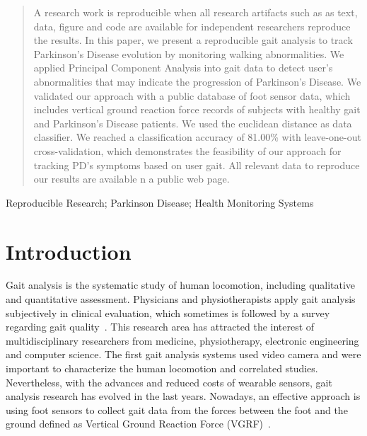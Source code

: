 \documentclass[10pt, conference, compsocconf]{IEEEtran}
\begin{document}




\maketitle


\begin{abstract}
A research work is reproducible when all research artifacts such as as text, data, figure and code are available for independent researchers reproduce the results. In this paper, we present a reproducible gait analysis to track Parkinson's Disease evolution by monitoring walking abnormalities. We applied Principal Component Analysis into gait data to detect user's abnormalities that may indicate the progression of Parkinson's Disease. We validated our approach with a public database of foot sensor data, which includes vertical ground reaction force records of subjects with healthy gait and Parkinson's Disease patients. We used the euclidean distance as data classifier. We reached a classification accuracy of 81.00\% with leave-one-out cross-validation, which demonstrates the feasibility of our approach for tracking PD's symptoms based on user gait. All relevant data to reproduce our results are available n a public web page.
\end{abstract}

\begin{IEEEkeywords}
Reproducible Research; Parkinson Disease; Health Monitoring Systems
\end{IEEEkeywords}


%
\IEEEpeerreviewmaketitle



\section{Introduction}
Gait analysis is the systematic study of human locomotion, including qualitative and quantitative assessment. Physicians and physiotherapists apply gait analysis subjectively in clinical evaluation, which sometimes is followed by a survey regarding gait quality~\cite{gait2014}. This research area has attracted the interest of multidisciplinary researchers from medicine, physiotherapy, electronic engineering and computer science. The first gait analysis systems used video camera and were important to characterize the human locomotion and correlated studies. Nevertheless, with the advances and reduced costs of wearable sensors, gait analysis research has evolved in the last years. Nowadays, an effective approach is using foot sensors to collect gait data from the forces between the foot and the ground defined as Vertical Ground Reaction Force (VGRF)~\cite{neumankensiology}. 
\end{document}
